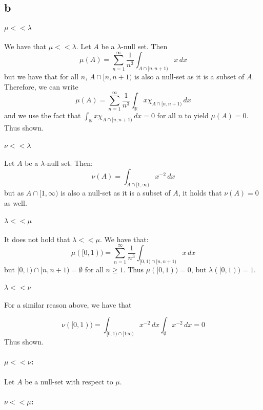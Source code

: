 \documentclass{article}
\theoremstyle{definition}
\numberwithin{theorem}{section}
\numberwithin{equation}{section}
\begin{document}
\subsection{b}
\paragraph{$\mu <<\lambda$}

We have that $\mu <<\lambda$. Let $A$ be a $\lambda$-null set. Then
\begin{equation}
	\mu(A) = \sum_{n = 1}^{\infty} \frac{1}{n^3} \int_{A\cap [n, n + 1)} x \, dx 
\end{equation}
but we have that for all $n$, $A\cap [n, n + 1)$ is also a null-set as it is a subset of $A$. Therefore, we can write
\begin{equation}
	\mu(A) = \sum_{n = 1}^{\infty} \frac{1}{n^3} \int_{\mathbb{R}} x \chi_{A\cap [n, n + 1)} \, dx 
\end{equation}
and we use the fact that $\int_{\mathbb{R}} x \chi_{A\cap [n, n + 1)} \, dx  = 0$ for all $n$ to yield $\mu(A) = 0$. Thus shown.

\paragraph{$\nu <<\lambda$}

Let $A$ be a $\lambda$-null set. Then:
\begin{equation}
	\nu(A) = \int_{A \cap [1, \infty)} x^{-2} \, dx
\end{equation}
but as $A \cap [1, \infty)$ is also a null-set as it is a subset of $A$, it holds that $\nu(A) = 0$ as well. 

\paragraph{$\lambda << \mu$}
It does not hold that $\lambda << \mu$. We have that:
\begin{equation}
	\mu([0, 1)) = 
	\sum_{n = 1}^{\infty} \frac{1}{n^3} \int_{[0, 1)\cap [n, n + 1)} x\, dx 
\end{equation}
but $[0, 1)\cap [n, n + 1) = \emptyset$ for all $n \geq 1$. Thus $\mu([0, 1)) = 0$, but $\lambda([0, 1)) = 1$. 

\paragraph{$\lambda << \nu$}
For a similar reason above, we have that

\begin{equation}
	\nu([0, 1)) = \int_{[0, 1) \cap [1 \infty)} x^{-2} \, dx\int_{\emptyset} x^{-2} \, dx = 0
\end{equation}
Thus shown.

\paragraph{$\mu << \nu$:}
Let $A$ be a null-set with respect to $\mu$. 

\paragraph{$\nu << \mu$:}
\end{document}
